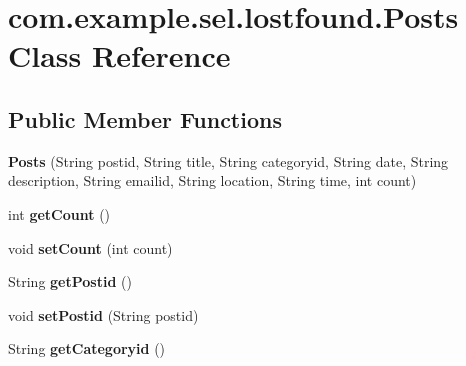 \hypertarget{classcom_1_1example_1_1sel_1_1lostfound_1_1Posts}{\section{com.\-example.\-sel.\-lostfound.\-Posts Class Reference}
\label{classcom_1_1example_1_1sel_1_1lostfound_1_1Posts}
}
\subsection*{Public Member Functions}
\begin{DoxyCompactItemize}
\item 
\hypertarget{classcom_1_1example_1_1sel_1_1lostfound_1_1Posts_afde73b3796b65394584d6519f8cf755d}{{\bfseries Posts} (String postid, String title, String categoryid, String date, String description, String emailid, String location, String time, int count)}\label{classcom_1_1example_1_1sel_1_1lostfound_1_1Posts_afde73b3796b65394584d6519f8cf755d}

\item 
\hypertarget{classcom_1_1example_1_1sel_1_1lostfound_1_1Posts_afff96008f7ac224ad553becca11542cd}{int {\bfseries get\-Count} ()}\label{classcom_1_1example_1_1sel_1_1lostfound_1_1Posts_afff96008f7ac224ad553becca11542cd}

\item 
\hypertarget{classcom_1_1example_1_1sel_1_1lostfound_1_1Posts_abde1342814967338d4de2e4b977bc82b}{void {\bfseries set\-Count} (int count)}\label{classcom_1_1example_1_1sel_1_1lostfound_1_1Posts_abde1342814967338d4de2e4b977bc82b}

\item 
\hypertarget{classcom_1_1example_1_1sel_1_1lostfound_1_1Posts_a34e6ab517817eb471edaba45c315fee1}{String {\bfseries get\-Postid} ()}\label{classcom_1_1example_1_1sel_1_1lostfound_1_1Posts_a34e6ab517817eb471edaba45c315fee1}

\item 
\hypertarget{classcom_1_1example_1_1sel_1_1lostfound_1_1Posts_a46ba763542f61920dd2c463a9a095ffd}{void {\bfseries set\-Postid} (String postid)}\label{classcom_1_1example_1_1sel_1_1lostfound_1_1Posts_a46ba763542f61920dd2c463a9a095ffd}

\item 
\hypertarget{classcom_1_1example_1_1sel_1_1lostfound_1_1Posts_aee612c3070e43b57cd86fd812322a481}{String {\bfseries get\-Categoryid} ()}\label{classcom_1_1example_1_1sel_1_1lostfound_1_1Posts_aee612c3070e43b57cd86fd812322a481}


\end{DoxyCompactItemize}
